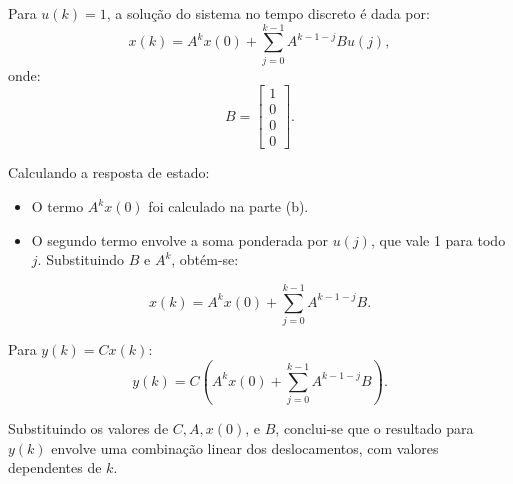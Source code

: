 \begin{resolution}
  Para \( u(k) = 1 \), a solução do sistema no tempo discreto é dada por:
  \[
    x(k) = A^k x(0) + \sum_{j=0}^{k-1} A^{k-1-j} B u(j),
  \]
  onde:
  \[
    B =
    \begin{bmatrix}
      1 \\ 0 \\ 0 \\ 0
    \end{bmatrix}.
  \]

  Calculando a resposta de estado:
  \begin{itemize}
    \item O termo \( A^k x(0) \) foi calculado na parte (b).
    \item O segundo termo envolve a soma ponderada por \( u(j) \), que vale 1 para todo \( j \). Substituindo \( B \) e \( A^k \), obtém-se:
  \end{itemize}
  \[
    x(k) = A^k x(0) + \sum_{j=0}^{k-1} A^{k-1-j} B.
  \]

  Para \( y(k) = C x(k) \):
  \[
    y(k) = C \left( A^k x(0) + \sum_{j=0}^{k-1} A^{k-1-j} B \right).
  \]

  Substituindo os valores de \( C, A, x(0) \), e \( B \), conclui-se que o resultado para \( y(k) \) envolve uma combinação linear dos deslocamentos, com valores dependentes de \( k \).
\end{resolution}

